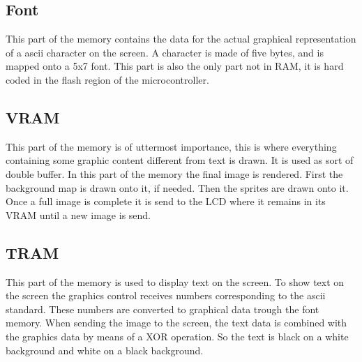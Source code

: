 	\subsection{Font}
		\par This part of the memory contains the data for the actual graphical representation of a ascii character on the screen. A character is made of five bytes, and is mapped onto a 5x7 font. This part is also the only part not in RAM, it is hard coded in the flash region of the microcontroller.

	\subsection{VRAM}
		\par This part of the memory is of uttermost importance, this is where everything containing some graphic content different from text is drawn. It is used as sort of double buffer. In this part of the memory the final image is rendered. First the background map is drawn onto it, if needed. Then the sprites are drawn onto it. Once a full image is complete it is send to the LCD where it remains in its VRAM until a new image is send.

	\subsection{TRAM}
		\par This part of the memory is used to display text on the screen. To show text on the screen the graphics control receives numbers corresponding to the ascii standard. These numbers are converted to graphical data trough the font memory. When sending the image to the screen, the text data is combined with the graphics data by means of a XOR operation. So the text is black on a white background and white on a black background.
